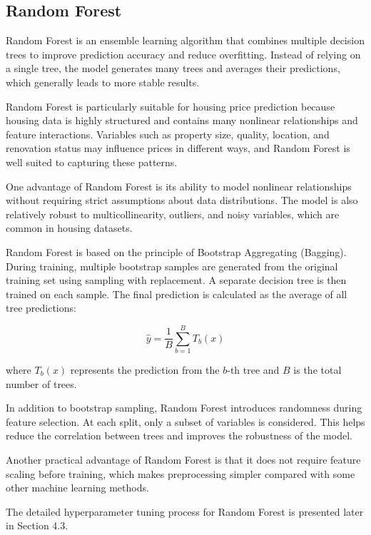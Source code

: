 \documentclass[12pt,a4paper,oneside,openany]{book}
\begin{document}
\subsection{Random Forest}

Random Forest is an ensemble learning algorithm that combines multiple decision trees to improve prediction accuracy and reduce overfitting. Instead of relying on a single tree, the model generates many trees and averages their predictions, which generally leads to more stable results.

Random Forest is particularly suitable for housing price prediction because housing data is highly structured and contains many nonlinear relationships and feature interactions. Variables such as property size, quality, location, and renovation status may influence prices in different ways, and Random Forest is well suited to capturing these patterns.

One advantage of Random Forest is its ability to model nonlinear relationships without requiring strict assumptions about data distributions. The model is also relatively robust to multicollinearity, outliers, and noisy variables, which are common in housing datasets.

Random Forest is based on the principle of Bootstrap Aggregating (Bagging). During training, multiple bootstrap samples are generated from the original training set using sampling with replacement. A separate decision tree is then trained on each sample. The final prediction is calculated as the average of all tree predictions:

\begin{equation}
\hat{y} = \frac{1}{B} \sum_{b=1}^{B} T_b(x)
\end{equation}

where $T_b(x)$ represents the prediction from the $b$-th tree and $B$ is the total number of trees.

In addition to bootstrap sampling, Random Forest introduces randomness during feature selection. At each split, only a subset of variables is considered. This helps reduce the correlation between trees and improves the robustness of the model.

Another practical advantage of Random Forest is that it does not require feature scaling before training, which makes preprocessing simpler compared with some other machine learning methods.

The detailed hyperparameter tuning process for Random Forest is presented later in Section 4.3.
\end{document}
